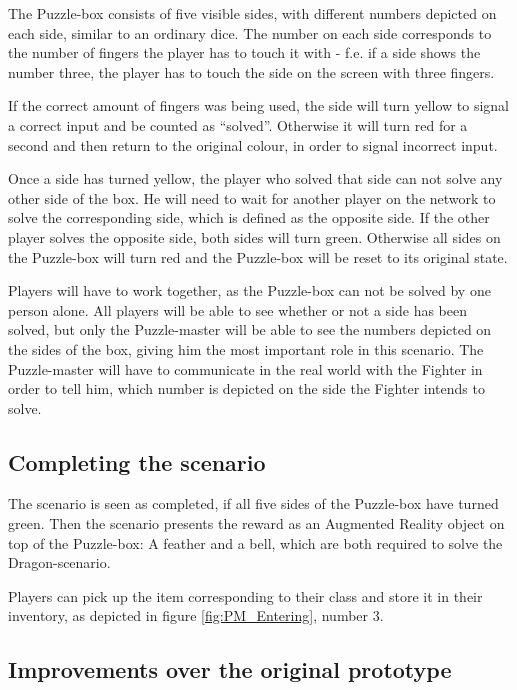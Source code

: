 \documentclass{sigchi-ext}
\begin{document}
The Puzzle-box consists of five visible sides, with different numbers depicted on each side, similar to an ordinary dice. The number on each side corresponds to the number of fingers the player has to touch it with - f.e. if a side shows the number three, the player has to touch the side on the screen with three fingers.

If the correct amount of fingers was being used, the side will turn yellow to signal a correct input and be counted as ``solved''. Otherwise it will turn red for a second and then return to the original colour, in order to signal incorrect input.

Once a side has turned yellow, the player who solved that side can not solve any other side of the box. He will need to wait for another player on the network to solve the corresponding side, which is defined as the opposite side. If the other player solves the opposite side, both sides will turn green. Otherwise all sides on the Puzzle-box will turn red and the Puzzle-box will be reset to its original state.

Players will have to work together, as the Puzzle-box can not be solved by one person alone. All players will be able to see whether or not a side has been solved, but only the Puzzle-master will be able to see the numbers depicted on the sides of the box, giving him the most important role in this scenario. The Puzzle-master will have to communicate in the real world with the Fighter in order to tell him, which number is depicted on the side the Fighter intends to solve.

\subsection{Completing the scenario}

The scenario is seen as completed, if all five sides of the Puzzle-box have turned green. Then the scenario presents the reward as an Augmented Reality object on top of the Puzzle-box: A feather and a bell, which are both required to solve the Dragon-scenario.

Players can pick up the item corresponding to their class and store it in their inventory, as depicted in figure \ref{fig:PM_Entering}, number 3.

\subsection{Improvements over the original prototype}
\end{document}
